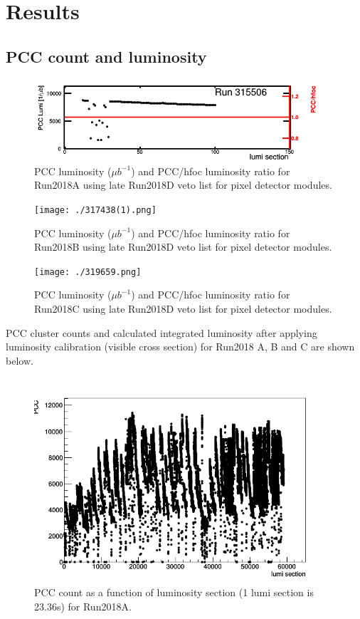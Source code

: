\section{Results}
\label{sec:results}

\subsection{PCC count and luminosity}

\begin{figure}[H]
  \centering
  \includegraphics[width=1\columnwidth]{./crop.png}
  \caption{PCC luminosity ($\mu b^{-1}$) and PCC/hfoc luminosity ratio for Run2018A using late Run2018D veto list for pixel detector modules.}
  \label{fig:CMS}
\end{figure}


\begin{figure}[H]
  \centering
  \texttt{[image: ./317438(1).png]}
  \caption{PCC luminosity ($\mu b^{-1}$) and PCC/hfoc luminosity ratio for Run2018B using late Run2018D veto list for pixel detector modules.}
  \label{fig:CMS}
\end{figure}


\begin{figure}[H]
  \centering
  \texttt{[image: ./319659.png]}
  \caption{PCC luminosity ($\mu b^{-1}$) and PCC/hfoc luminosity ratio for Run2018C using late Run2018D veto list for pixel detector modules.}
  \label{fig:CMS}
\end{figure}


PCC cluster counts and calculated integrated luminosity after applying luminosity calibration (visible cross section) for Run2018 A, B and C are shown below.

 \begin{figure}[H]
  \centering
  \includegraphics[width=0.52\columnwidth]{./ls_lumi.png}
  \caption{PCC count as a function of luminosity section (1 lumi section is 23.36s) for Run2018A.}
  \label{fig:CMS}
\end{figure}


